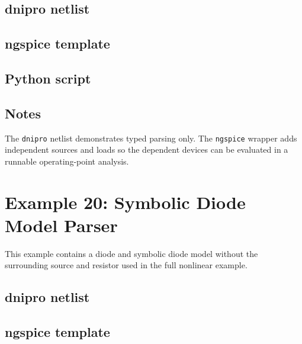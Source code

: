 \documentclass[11pt,a4paper]{article}
\newcommand{\project}{\texttt{dnipro}}
\newcommand{\ngspice}{\texttt{ngspice}}
\begin{document}
\subsection{dnipro netlist}



\subsection{ngspice template}



\subsection{Python script}



\subsection{Notes}

The \project{} netlist demonstrates typed parsing only. The \ngspice{} wrapper
adds independent sources and loads so the dependent devices can be evaluated in a
runnable operating-point analysis.

\section{Example 20: Symbolic Diode Model Parser}
\label{sec:ex-diode-parser-symbolic}

This example contains a diode and symbolic diode model without the surrounding
source and resistor used in the full nonlinear example.

\subsection{dnipro netlist}



\subsection{ngspice template}
\end{document}
